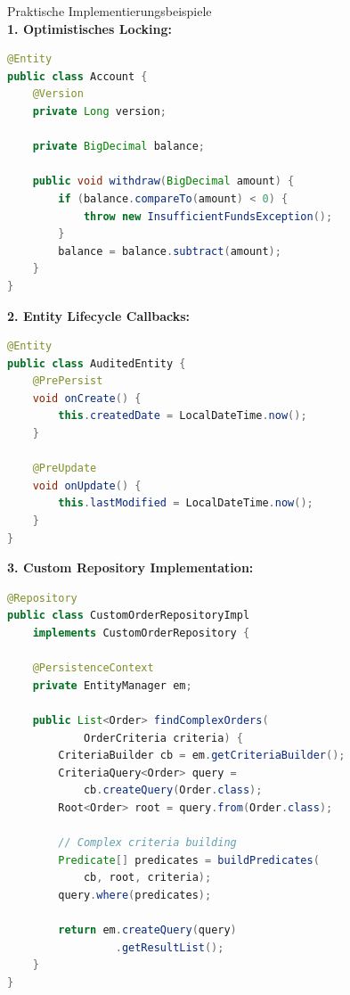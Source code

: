 \begin{example2}{Praktische Implementierungsbeispiele}\\
\textbf{1. Optimistisches Locking:}
\begin{lstlisting}[language=Java, style=basesmol]
@Entity
public class Account {
    @Version
    private Long version;
    
    private BigDecimal balance;
    
    public void withdraw(BigDecimal amount) {
        if (balance.compareTo(amount) < 0) {
            throw new InsufficientFundsException();
        }
        balance = balance.subtract(amount);
    }
}
\end{lstlisting}

\textbf{2. Entity Lifecycle Callbacks:}
\begin{lstlisting}[language=Java, style=basesmol]
@Entity
public class AuditedEntity {
    @PrePersist
    void onCreate() {
        this.createdDate = LocalDateTime.now();
    }
    
    @PreUpdate
    void onUpdate() {
        this.lastModified = LocalDateTime.now();
    }
}
\end{lstlisting}

\textbf{3. Custom Repository Implementation:}
\begin{lstlisting}[language=Java, style=basesmol]
@Repository
public class CustomOrderRepositoryImpl 
    implements CustomOrderRepository {
    
    @PersistenceContext
    private EntityManager em;
    
    public List<Order> findComplexOrders(
            OrderCriteria criteria) {
        CriteriaBuilder cb = em.getCriteriaBuilder();
        CriteriaQuery<Order> query = 
            cb.createQuery(Order.class);
        Root<Order> root = query.from(Order.class);
        
        // Complex criteria building
        Predicate[] predicates = buildPredicates(
            cb, root, criteria);
        query.where(predicates);
        
        return em.createQuery(query)
                 .getResultList();
    }
}
\end{lstlisting}
\end{example2}




